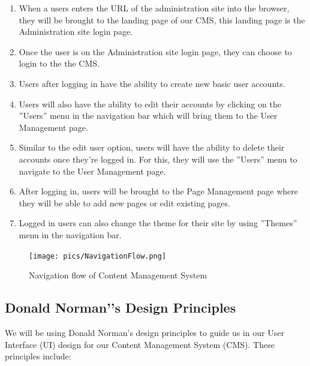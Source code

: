 \documentclass[12pt]{article}
\begin{document}
\begin{enumerate}
  \item When a users enters the URL of the administration site into the browser, they will be brought to the landing page of our CMS, this landing page is the Administration site login page.
  \item Once the user is on the Administration site login page, they can choose to login to the the CMS.
  \item Users after logging in have the ability to create new basic user accounts.
  \item Users will also have the ability to edit their accounts by clicking on the ''Users'' menu in the navigation bar which will bring them to the User Management page.
  \item Similar to the edit user option, users will have the ability to delete their accounts once they're logged in. For this, they will use the ''Users'' menu to navigate to the User Management page.
  \item After logging in, users will be brought to the Page Management page where they will be able to add new pages or edit existing pages.
  \item Logged in users can also change the theme for their site by using ''Themes'' menu in the navigation bar.
\end{enumerate} 


\begin{figure}[H]
  
  \centering
    \texttt{[image: pics/NavigationFlow.png]}
    \caption{Navigation flow of Content Management System}
\end{figure}


\subsection{Donald Norman’'s Design Principles}
We will be using Donald Norman's design principles to guide us in our User Interface (UI) design for our Content Management System (CMS). These principles include: 
\end{document}
